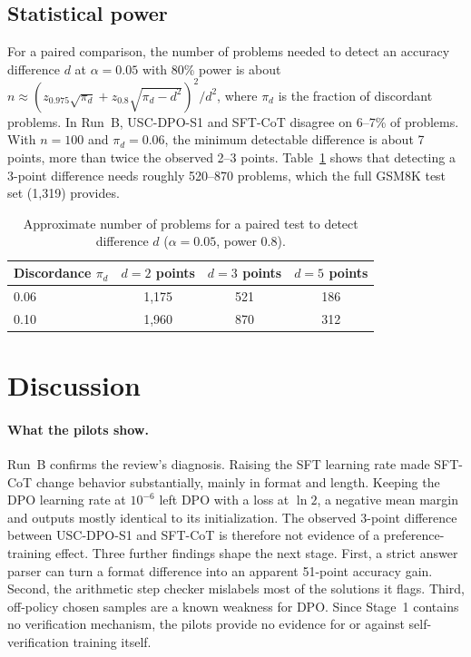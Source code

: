 \documentclass[11pt, a4paper]{article}
\newcommand{\soldpo}{USC-DPO-S1}
\begin{document}
\subsection{Statistical power}
For a paired comparison, the number of problems needed to detect an accuracy difference $d$ at $\alpha=0.05$ with 80\% power is about $n\approx(z_{0.975}\sqrt{\pi_d}+z_{0.8}\sqrt{\pi_d-d^2})^2/d^2$, where $\pi_d$ is the fraction of discordant problems. In Run~B, \soldpo{} and SFT-CoT disagree on 6--7\% of problems. With $n=100$ and $\pi_d=0.06$, the minimum detectable difference is about 7 points, more than twice the observed 2--3 points. Table~\ref{tab:power} shows that detecting a 3-point difference needs roughly 520--870 problems, which the full GSM8K test set (1{,}319) provides.

\begin{table}[t]
\centering
\caption{Approximate number of problems for a paired test to detect difference $d$ ($\alpha=0.05$, power 0.8).}
\label{tab:power}
\small
\begin{tabular}{lccc}
\toprule
Discordance $\pi_d$ & $d=2$ points & $d=3$ points & $d=5$ points \\
\midrule
0.06 & 1{,}175 & 521 & 186 \\
0.10 & 1{,}960 & 870 & 312 \\
\bottomrule
\end{tabular}
\end{table}

\section{Discussion}
\label{sec:discussion}
\paragraph{What the pilots show.} Run~B confirms the review's diagnosis. Raising the SFT learning rate made SFT-CoT change behavior substantially, mainly in format and length. Keeping the DPO learning rate at $10^{-6}$ left DPO with a loss at $\ln 2$, a negative mean margin and outputs mostly identical to its initialization. The observed 3-point difference between \soldpo{} and SFT-CoT is therefore not evidence of a preference-training effect. Three further findings shape the next stage. First, a strict answer parser can turn a format difference into an apparent 51-point accuracy gain. Second, the arithmetic step checker mislabels most of the solutions it flags. Third, off-policy chosen samples are a known weakness for DPO. Since Stage~1 contains no verification mechanism, the pilots provide no evidence for or against self-verification training itself.
\end{document}
